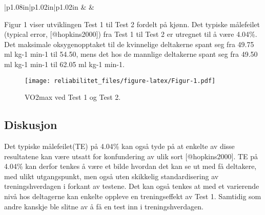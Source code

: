 \documentclass[
]{article}
\begin{document}
\begin{longtable}[c]{|p{1.08in}|p{1.02in}|p{1.02in}}
 &  &  \\

\noalign{\global\setlength{\arrayrulewidth}{2pt}}



\end{longtable}

Figur 1 viser utviklingen Test 1 til Test 2 fordelt på kjønn. Det
typiske målefeilet (typical error, {[}@hopkins2000{]}) fra Test 1 til
Test 2 er utregnet til å være 4.04\%. Det maksimale oksygenopptaket til
de kvinnelige deltakerne spant seg fra 49.75 ml kg-1 min-1 til 54.50,
mens det hos de mannlige deltakerne spant seg fra 49.50 ml kg-1 min-1
til 62.05 ml kg-1 min-1.

\begin{figure}
\centering
\texttt{[image: reliabilitet\_files/figure-latex/Figur-1.pdf]}
\caption{VO2max ved Test 1 og Test 2.}
\end{figure}

\hypertarget{diskusjon}{%
\subsection{Diskusjon}\label{diskusjon}}

Det typiske målefeilet(TE) på 4.04\% kan også tyde på at enkelte av
disse resultatene kan være utsatt for konfundering av ulik sort
{[}@hopkins2000{]}. TE på 4.04\% kan derfor tenkes å være et bilde
hvordan det kan se ut med få deltakere, med ulikt utgangspunkt, men også
uten skikkelig standardisering av treningshverdagen i forkant av
testene. Det kan også tenkes at med et varierende nivå hos deltagerne
kan enkelte oppleve en treningseffekt av Test 1. Samtidig som andre
kanskje ble slitne av å få en test inn i treningshverdagen.
\end{document}
